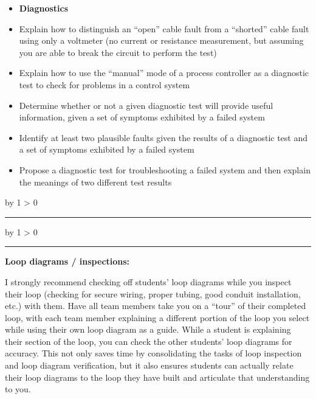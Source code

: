 \documentclass[12pt,a4paper]{article}
\def\svar{
           \advance\answnum by 1
           \ifnum \answnum > 0
                \hrule
                \vskip 3pt
                \leftline{Svar \the\answnum}
                \vskip 3pt \fi}
\def\notes{
           \advance\explnum by 1
           \ifnum \explnum > 0
                \hrule
                \vskip 3pt
                \leftline{Notes \the\explnum}
                \vskip 3pt \fi}
\begin{document}
\filbreak

\begin{itemize}
\item{} {\bf Diagnostics}
\item{} Explain how to distinguish an ``open'' cable fault from a ``shorted'' cable fault using only a voltmeter (no current or resistance measurement, but assuming you are able to break the circuit to perform the test)
\item{} Explain how to use the ``manual'' mode of a process controller as a diagnostic test to check for problems in a control system
\item{} Determine whether or not a given diagnostic test will provide useful information, given a set of symptoms exhibited by a failed system
\item{} Identify at least two plausible faults given the results of a diagnostic test and a set of symptoms exhibited by a failed system
\item{} Propose a diagnostic test for troubleshooting a failed system and then explain the meanings of two different test results
\end{itemize}



\vskip 10pt \filbreak 





\svar{} 


\vskip 10pt \filbreak 





\notes{} 

\noindent
{\bf Loop diagrams / inspections:}

I strongly recommend checking off students' loop diagrams while you inspect their loop (checking for secure wiring, proper tubing, good conduit installation, etc.) with them.  Have all team members take you on a ``tour'' of their completed loop, with each team member explaining a different portion of the loop you select while using their own loop diagram as a guide.  While a student is explaining their section of the loop, you can check the other students' loop diagrams for accuracy.  This not only saves time by consolidating the tasks of loop inspection and loop diagram verification, but it also ensures students can actually relate their loop diagrams to the loop they have built and articulate that understanding to you.
\end{document}
